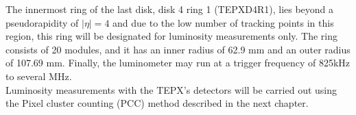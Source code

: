 \begin{table}[H]
\centering
\caption[Radius and number of pixel modules that comprise the rings of the TEPX subdetector.]{ Table shows the inner ($r_{in}$) and outer ($r_{out}$) radius, as well as the number of pixel modules that comprise each ring of each disk of the TEPX subdetector}
\label{rings}
\end{table}


The innermost ring of the last disk, disk 4 ring 1 (TEPXD4R1), lies beyond a pseudorapidity of $|\eta|=4$ and due to the low number of tracking points in this region, this ring will be designated for luminosity measurements only. The ring consists of 20 modules, and it has an inner radius of 62.9 mm and an outer radius of  107.69 mm. Finally, the luminometer may run at a trigger frequency of 825kHz to several MHz.\\
Luminosity measurements with the TEPX's detectors will be carried out using the Pixel cluster counting (PCC) method described in the next chapter.
